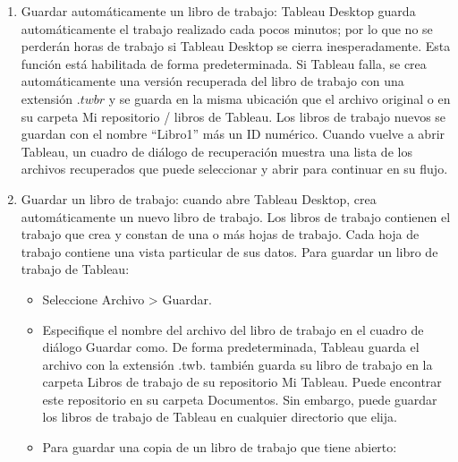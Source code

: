 \documentclass[
]{book}
\providecommand{\tightlist}{%
  \setlength{\itemsep}{0pt}\setlength{\parskip}{0pt}}
\begin{document}
\begin{enumerate}
\def\labelenumi{\arabic{enumi}.}
\item
  Guardar automáticamente un libro de trabajo: Tableau Desktop guarda automáticamente el trabajo realizado cada pocos minutos; por lo que no se perderán horas de trabajo si Tableau Desktop se cierra inesperadamente. Esta función está habilitada de forma predeterminada.
  Si Tableau falla, se crea automáticamente una versión recuperada del libro de trabajo con una extensión \(.twbr\) y se guarda en la misma ubicación que el archivo original o en su carpeta Mi repositorio / libros de Tableau. Los libros de trabajo nuevos se guardan con el nombre ``Libro1'' más un ID numérico. Cuando vuelve a abrir Tableau, un cuadro de diálogo de recuperación muestra una lista de los archivos recuperados que puede seleccionar y abrir para continuar en su flujo.
\item
  Guardar un libro de trabajo: cuando abre Tableau Desktop, crea automáticamente un nuevo libro de trabajo. Los libros de trabajo contienen el trabajo que crea y constan de una o más hojas de trabajo. Cada hoja de trabajo contiene una vista particular de sus datos. Para guardar un libro de trabajo de Tableau:

  \begin{itemize}
  \tightlist
  \item
    Seleccione Archivo \textgreater{} Guardar.
  \item
    Especifique el nombre del archivo del libro de trabajo en el cuadro de
    diálogo Guardar como.
    De forma predeterminada, Tableau guarda el archivo con la extensión .twb.
    también guarda su libro de trabajo en la carpeta
    Libros de trabajo de su repositorio Mi Tableau. Puede encontrar este
    repositorio en su carpeta Documentos. Sin embargo, puede guardar los
    libros de trabajo de Tableau en cualquier directorio que elija.
  \item
    Para guardar una copia de un libro de trabajo que tiene abierto:


\end{itemize}
\end{enumerate}
\end{document}
